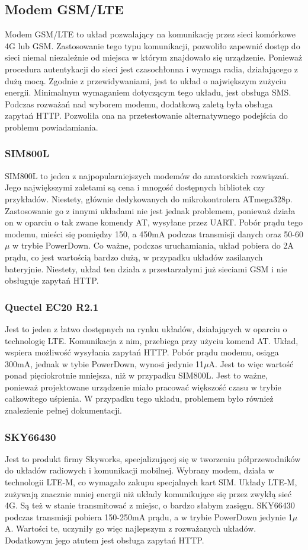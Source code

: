 \subsection{Modem GSM/LTE}
Modem GSM/LTE to układ pozwalający na komunikację przez sieci komórkowe 4G lub GSM. Zastosowanie tego typu komunikacji, pozwoliło zapewnić dostęp do sieci niemal niezależnie od miejsca w którym znajdowało się urządzenie. Ponieważ procedura autentykacji do sieci jest czasochłonna i wymaga radia, działającego z dużą mocą. Zgodnie z przewidywaniami, jest to układ o największym zużyciu energii. Minimalnym wymaganiem dotyczącym tego układu, jest obsługa SMS. Podczas rozważań nad wyborem modemu, dodatkową zaletą była obsługa zapytań HTTP. Pozwoliła ona na przetestowanie alternatywnego podejścia do problemu powiadamiania.

\subsubsection{SIM800L}
SIM800L to jeden z najpopularniejszych modemów do amatorskich rozwiązań. Jego największymi zaletami są cena i mnogość dostępnych bibliotek czy przykładów. Niestety, głównie dedykowanych do mikrokontrolera ATmega328p. Zastosowanie go z innymi układami nie jest jednak problemem, ponieważ działa on w oparciu o tak zwane komendy AT, wysyłane przez UART. Pobór prądu tego modemu, mieści się pomiędzy 150, a 450mA podczas transmisji danych oraz 50-60$\mu$ w trybie PowerDown. Co ważne, podczas uruchamiania, układ pobiera do 2A prądu, co jest wartością bardzo dużą, w przypadku układów zasilanych bateryjnie. Niestety, układ ten działa z przestarzałymi już sieciami GSM i nie obsługuje zapytań HTTP.\cite{SIM800L}

\subsubsection{Quectel EC20 R2.1}
Jest to jeden z łatwo dostępnych na rynku układów, działających w oparciu o technologię LTE. Komunikacja z nim, przebiega przy użyciu komend AT. Układ, wspiera możliwość wysyłania zapytań HTTP. Pobór prądu modemu, osiąga 300mA, jednak w tybie PowerDown, wynosi jedynie 11$\mu$A. Jest to więc wartość ponad pięciokrotnie mniejsza, niż w przypadku SIM800L. Jest to ważne, ponieważ projektowane urządzenie miało pracować większość czasu w trybie całkowitego uśpienia. W przypadku tego układu, problemem było również znalezienie pełnej dokumentacji.

\subsubsection{SKY66430}
Jest to produkt firmy Skyworks, specjalizującej się w tworzeniu półprzewodników do układów radiowych i komunikacji mobilnej. Wybrany modem, działa w technologii LTE-M, co wymagało zakupu specjalnych kart SIM. Układy LTE-M, zużywają znacznie mniej energii niż układy komunikujące się przez zwykłą sieć 4G. Są też w stanie transmitować z miejsc, o bardzo słabym zasięgu. SKY66430 podczas transmisji pobiera 150-250mA prądu, a w trybie PowerDown jedynie 1$\mu$A. Wartości te, uczyniły go więc najlepszym z rozważanych układów. Dodatkowym jego atutem jest obsługa zapytań HTTP. \cite{SKY66430}

